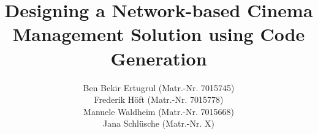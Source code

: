 \documentclass[praxisarbeit,english,oneside]{framework/hgbthesis}
\begin{document}

\title{Designing a Network-based Cinema Management Solution using Code Generation}
\prueferBack{} %
\author{{Ben Bekir Ertugrul (Matr.-Nr. 7015745)\texorpdfstring{\\}{ }Frederik Höft (Matr.-Nr. 7015778)\texorpdfstring{\\}{ }Manuele Waldheim (Matr.-Nr. 7015668)\texorpdfstring{\\}{ }Jana Schlüsche (Matr.-Nr. X)}\texorpdfstring{\\}{ }}
\authorstreet{}
\authortown{}

\frontmatter
\maketitle



\listoftodos %

\\
\\
\\
\\




\inhaltsverzeichnis

\mainmatter         %









\lists
\listoflistings
{}

\printnoidxglossary[type=\acronymtype, sort=word]
\printnoidxglossary[sort=word]

\MakeBibliography %

\appendixpage

%

%
%
%
\end{document}

